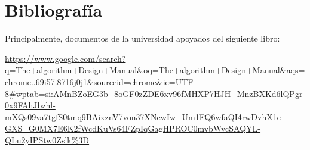 \documentclass[a4paper, 12.5pt]{report}
\begin{document}

\section{Bibliografía}

Principalmente, documentos de la universidad apoyados del siguiente libro:

\url{https://www.google.com/search?q=The+algorithm+Design+Manual&oq=The+algorithm+Design+Manual&aqs=chrome..69i57.8716j0j1&sourceid=chrome&ie=UTF-8#wptab=si:AMnBZoEG3b_8oGF0zZDE6xv96fMHXP7HJH_MnzBXKd6lQPgr0x9FAhJbzhl-mXQs09va7tgfS0tmq9BAixznV7von37XNewIw_Um1FQ6wfaQI4rwDvhX1e-GXS_G0MX7E6K2fWcdKuVs64FZpIqGagHPROC0mvbWvcSAQYL-QLu2yIPStw0Zslk%3D}
\end{document}
